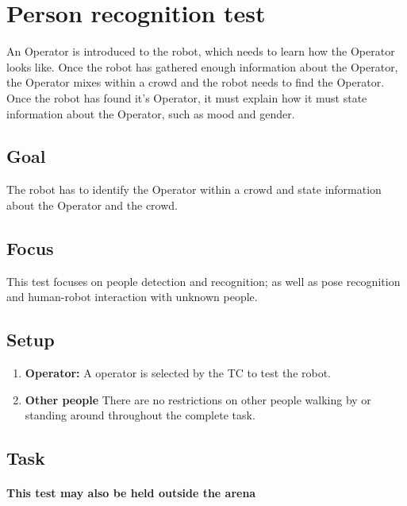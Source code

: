 \section{Person recognition test}

An Operator is introduced to the robot, which needs to learn how the Operator looks like. Once the robot has gathered enough information about the Operator, the Operator mixes within a crowd and the robot needs to find the Operator. Once the robot has found it's Operator, it must explain how it must state information about the Operator, such as mood and gender.

\subsection{Goal}
The robot has to identify the Operator within a crowd and state information about the Operator and the crowd.

\subsection{Focus}

This test focuses on people detection and recognition; as well as pose recognition and human-robot interaction with unknown people.

\subsection{Setup}

\begin{enumerate}
\item \textbf{Operator:} A  operator is selected by the TC to test the robot.
\item \textbf{Other people} There are no restrictions on other people walking by or standing around throughout the complete task.
\end{enumerate}

\subsection{Task}
\paragraph{This test may also be held outside the arena}

